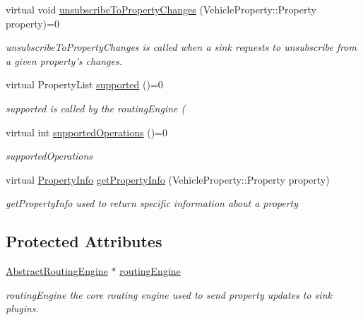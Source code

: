 \begin{DoxyCompactItemize}
virtual void \hyperlink{classAbstractSource_a584372310f191b1b9067a634b7366023}{unsubscribe\-To\-Property\-Changes} (Vehicle\-Property\-::\-Property property)=0
\begin{DoxyCompactList}\small\item\em unsubscribe\-To\-Property\-Changes is called when a sink requests to unsubscribe from a given property's changes. \end{DoxyCompactList}\item 
virtual Property\-List \hyperlink{classAbstractSource_ad8330cbbac84dc24851eb50ff7243460}{supported} ()=0
\begin{DoxyCompactList}\small\item\em supported is called by the routing\-Engine ( \end{DoxyCompactList}\item 
virtual int \hyperlink{classAbstractSource_a317861675652372a72fc01c075036b51}{supported\-Operations} ()=0
\begin{DoxyCompactList}\small\item\em supported\-Operations \end{DoxyCompactList}\item 
virtual \hyperlink{classPropertyInfo}{Property\-Info} \hyperlink{classAbstractSource_a5818ef06a4610d4969c6e1ed6a0c6242}{get\-Property\-Info} (Vehicle\-Property\-::\-Property property)
\begin{DoxyCompactList}\small\item\em get\-Property\-Info used to return specific information about a property \end{DoxyCompactList}\end{DoxyCompactItemize}
\subsection*{Protected Attributes}
\begin{DoxyCompactItemize}
\item 
\hyperlink{classAbstractRoutingEngine}{Abstract\-Routing\-Engine} $\ast$ \hyperlink{classAbstractSource_aabbce93fea123c54be55a007c928a6f1}{routing\-Engine}
\begin{DoxyCompactList}\small\item\em routing\-Engine the core routing engine used to send property updates to sink plugins. \end{DoxyCompactList}\end{DoxyCompactItemize}


